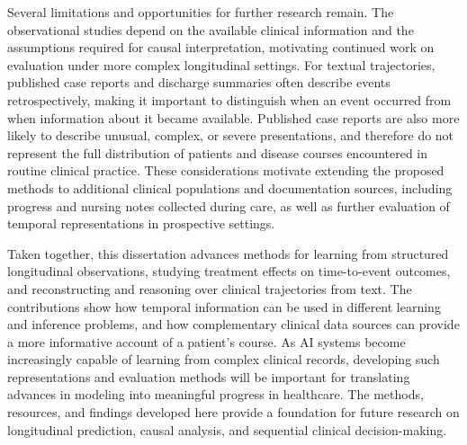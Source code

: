 Several limitations and opportunities for further research remain.
The observational studies depend on the available clinical information and the assumptions required for causal interpretation, motivating continued work on evaluation under more complex longitudinal settings.
For textual trajectories, published case reports and discharge summaries often describe events retrospectively, making it important to distinguish when an event occurred from when information about it became available.
Published case reports are also more likely to describe unusual, complex, or severe presentations, and therefore do not represent the full distribution of patients and disease courses encountered in routine clinical practice.
These considerations motivate extending the proposed methods to additional clinical populations and documentation sources, including progress and nursing notes collected during care, as well as further evaluation of temporal representations in prospective settings.

Taken together, this dissertation advances methods for learning from structured longitudinal observations, studying treatment effects on time-to-event outcomes, and reconstructing and reasoning over clinical trajectories from text.
The contributions show how temporal information can be used in different learning and inference problems, and how complementary clinical data sources can provide a more informative account of a patient's course.
As AI systems become increasingly capable of learning from complex clinical records, developing such representations and evaluation methods will be important for translating advances in modeling into meaningful progress in healthcare.
The methods, resources, and findings developed here provide a foundation for future research on longitudinal prediction, causal analysis, and sequential clinical decision-making.

